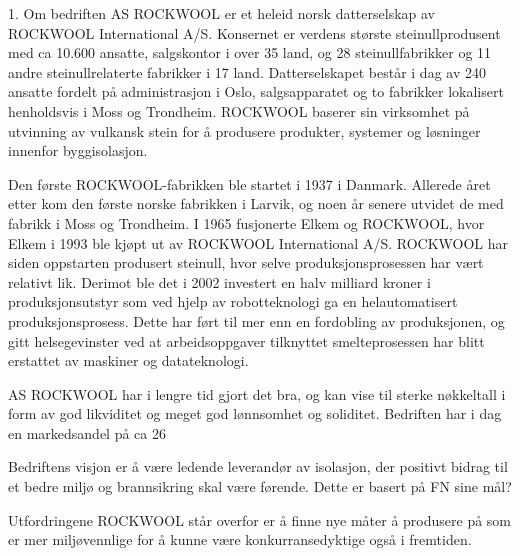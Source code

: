 \indent \newline 

1. Om bedriften
AS ROCKWOOL er et heleid norsk datterselskap av ROCKWOOL International A/S. Konsernet er verdens største steinullprodusent med ca 10.600 ansatte, salgskontor i over 35 land, og 28 steinullfabrikker og 11 andre steinullrelaterte fabrikker i 17 land. Datterselskapet består i dag av 240 ansatte fordelt på administrasjon i Oslo, salgsapparatet og to fabrikker lokalisert henholdsvis i Moss og Trondheim. ROCKWOOL baserer sin virksomhet på utvinning av vulkansk stein for å produsere produkter, systemer og løsninger innenfor byggisolasjon.

Den første ROCKWOOL-fabrikken ble startet i 1937 i Danmark. Allerede året etter kom den første norske fabrikken i Larvik, og noen år senere utvidet de med fabrikk i Moss og Trondheim. I 1965 fusjonerte Elkem og ROCKWOOL, hvor Elkem i 1993 ble kjøpt ut av ROCKWOOL International A/S. ROCKWOOL har siden oppstarten produsert steinull, hvor selve produksjonsprosessen har vært relativt lik. Derimot ble det i 2002 investert en halv milliard kroner i produksjonsutstyr som ved hjelp av robotteknologi ga en helautomatisert produksjonsprosess. Dette har ført til mer enn en fordobling av produksjonen, og gitt helsegevinster ved at arbeidsoppgaver tilknyttet smelteprosessen har blitt erstattet av maskiner og datateknologi.

AS ROCKWOOL har i lengre tid gjort det bra, og kan vise til sterke nøkkeltall i form av god likviditet og meget god lønnsomhet og soliditet. Bedriften har i dag en markedsandel på ca 26%

Bedriftens visjon er å være ledende leverandør av isolasjon, der positivt bidrag til et bedre miljø og brannsikring skal være førende. Dette er basert på FN sine mål?

Utfordringene ROCKWOOL står overfor er å finne nye måter å produsere på som er mer miljøvennlige for å kunne være konkurransedyktige også i fremtiden.

